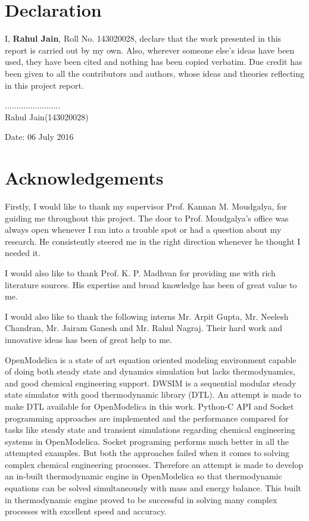 \documentclass[12pt]{report}
\begin{document}
\newpage

\section*{Declaration}
I, \textbf{Rahul Jain}, Roll No. 143020028, declare that the work presented in this report is carried out by my own. Also, wherever someone else's ideas have been used, they have been cited and nothing has been copied verbatim. Due credit has been given to all the contributors and authors, whose ideas and theories reflecting in this project report. \\
\vspace{3cm}

\begin{flushright}
........................ \\
Rahul Jain(143020028)
\end{flushright}

\vspace{3cm}

\begin{flushleft}
Date: 06 July 2016
\end{flushleft}

\newpage
\section*{Acknowledgements}
Firstly, I would like to thank my supervisor Prof. Kannan M. Moudgalya, for guiding me throughout this project. The door to Prof. Moudgalya's office was always open whenever I ran into a trouble spot or had a question about my research. He consistently steered me in the right direction whenever he thought I needed it.

I would also like to thank Prof. K. P. Madhvan for providing me with rich literature sources. His expertise and broad knowledge has been of great value to me.  

I would also like to thank the following interns Mr. Arpit Gupta, Mr. Neelesh Chandran, Mr. Jairam Ganesh and Mr. Rahul Nagraj. Their hard work and innovative ideas has been of great help to me. 


\abstract
OpenModelica is a state of art equation oriented modeling environment capable of doing both steady state and dynamics simulation but lacks thermodynamics, and good chemical engineering support. DWSIM is a sequential modular steady state simulator with good thermodynamic library (DTL). An attempt is made to make DTL available for OpenModelica in this work. Python-C API and Socket programming approaches are implemented and the performance compared for tasks like steady state and transient simulations regarding chemical engineering systems in OpenModelica. Socket programing performs much better in all the attempted examples. But both the approaches failed when it comes to solving complex chemical engineering processes. Therefore an attempt is made to develop an in-built thermodynamic engine in OpenModelica so that thermodynamic equations can be solved simultaneously with mass and energy balance. This built in thermodynamic engine proved to be successful in solving many complex processes with excellent speed and accuracy. 
\tableofcontents
\listoftables
\listoffigures
\end{document}
